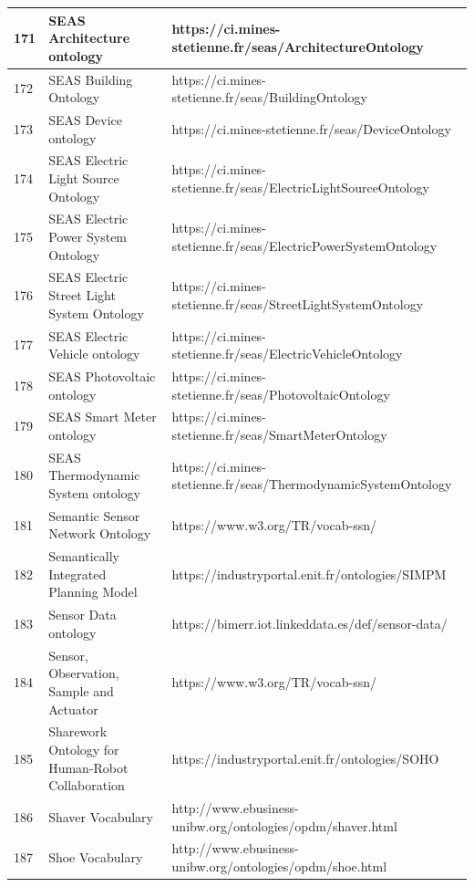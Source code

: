 \documentclass{article}
\begin{document}
\begin{table}[H]
{\begin{tabular}{|l|l|l|}
            171 & SEAS Architecture ontology & https://ci.mines-stetienne.fr/seas/ArchitectureOntology \\ \hline
            172 & SEAS Building Ontology & https://ci.mines-stetienne.fr/seas/BuildingOntology \\ \hline
            173 & SEAS Device ontology & https://ci.mines-stetienne.fr/seas/DeviceOntology \\ \hline
            174 & SEAS Electric Light Source Ontology & https://ci.mines-stetienne.fr/seas/ElectricLightSourceOntology \\ \hline
            175 & SEAS Electric Power System Ontology & https://ci.mines-stetienne.fr/seas/ElectricPowerSystemOntology \\ \hline
            176 & SEAS Electric Street Light System Ontology & https://ci.mines-stetienne.fr/seas/StreetLightSystemOntology \\ \hline
            177 & SEAS Electric Vehicle ontology & https://ci.mines-stetienne.fr/seas/ElectricVehicleOntology \\ \hline
            178 & SEAS Photovoltaic ontology & https://ci.mines-stetienne.fr/seas/PhotovoltaicOntology \\ \hline
            179 & SEAS Smart Meter ontology & https://ci.mines-stetienne.fr/seas/SmartMeterOntology \\ \hline
            180 & SEAS Thermodynamic System ontology & https://ci.mines-stetienne.fr/seas/ThermodynamicSystemOntology \\ \hline
            181 & Semantic Sensor Network Ontology & https://www.w3.org/TR/vocab-ssn/ \\ \hline
            182 & Semantically Integrated Planning Model & https://industryportal.enit.fr/ontologies/SIMPM \\ \hline
            183 & Sensor Data ontology & https://bimerr.iot.linkeddata.es/def/sensor-data/ \\ \hline
            184 & Sensor, Observation, Sample and Actuator & https://www.w3.org/TR/vocab-ssn/ \\ \hline
            185 & Sharework Ontology for Human-Robot Collaboration & https://industryportal.enit.fr/ontologies/SOHO \\ \hline
            186 & Shaver Vocabulary & http://www.ebusiness-unibw.org/ontologies/opdm/shaver.html \\ \hline
            187 & Shoe Vocabulary & http://www.ebusiness-unibw.org/ontologies/opdm/shoe.html \\ \hline

\end{tabular}}
\end{table}
\end{document}
